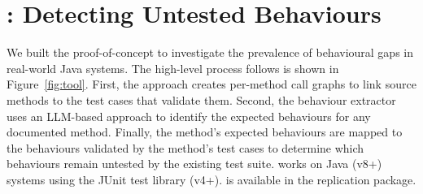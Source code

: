 



\section{\toolname{}: Detecting Untested Behaviours}
\label{sec:approach}


We built the \toolname{} proof-of-concept to investigate the prevalence of behavioural gaps in real-world Java systems.
The high-level process \toolname{} follows is shown in Figure~\ref{fig:tool}.
First, the approach creates per-method call graphs to link source methods to the test cases that validate them.
Second, the behaviour extractor uses an LLM-based approach to identify the expected behaviours for any documented method.
Finally, the method's expected behaviours are mapped to the behaviours validated by the method's test cases to determine which behaviours remain untested by the existing test suite. 
\toolname{} works on Java (v8+) systems using the JUnit test library (v4+).
\toolname{} is available in the replication package.




